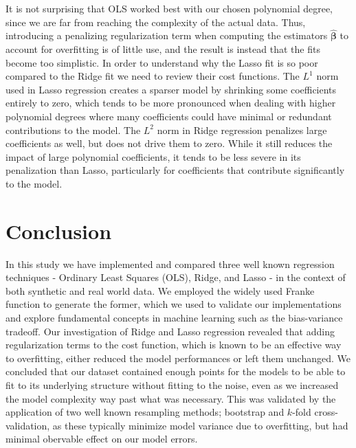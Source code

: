 \documentclass[aps,pra,english,notitlepage,reprint,nofootinbib]{revtex4-1}  %
\begin{document}
It is not surprising that OLS worked best with our chosen polynomial degree, since we are far from reaching the complexity of the actual data. Thus, introducing a penalizing regularization term when computing the estimators $\boldsymbol{\hat{\beta}}$ to account for overfitting is of little use, and the result is instead that the fits become too simplistic. In order to understand why the Lasso fit is so poor compared to the Ridge fit we need to review their cost functions. The $L^1$ norm used in Lasso regression creates a sparser model by shrinking some coefficients entirely to zero, which tends to be more pronounced when dealing with higher polynomial degrees where many coefficients could have minimal or redundant contributions to the model. The $L^2$ norm in Ridge regression penalizes large coefficients as well, but does not drive them to zero. While it still reduces the impact of large polynomial coefficients, it tends to be less severe in its penalization than Lasso, particularly for coefficients that contribute significantly to the model.


\section{Conclusion}\label{sec:conclusion}
In this study we have implemented and compared three well known regression techniques - Ordinary Least Squares (OLS), Ridge, and Lasso - in the context of both synthetic and real world data. We employed the widely used Franke function to generate the former, which we used to validate our implementations and explore fundamental concepts in machine learning such as the bias-variance tradeoff. Our investigation of Ridge and Lasso regression revealed that adding regularization terms to the cost function, which is known to be an effective way to overfitting, either reduced the model performances or left them unchanged. We concluded that our dataset contained enough points for the models to be able to fit to its underlying structure without fitting to the noise, even as we increased the model complexity way past what was necessary. This was validated by the application of two well known resampling methods; bootstrap and $k$-fold cross-validation, as these typically minimize model variance due to overfitting, but had minimal obervable effect on our model errors. 
\end{document}
